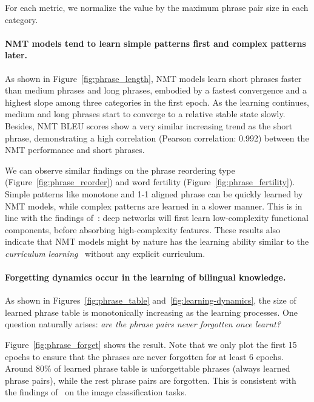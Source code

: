\documentclass[11pt,a4paper]{article}
\begin{document}
For each metric, we normalize the value by the maximum phrase pair size in each category.


\paragraph{NMT models tend to learn simple patterns first and complex patterns later.} As shown in Figure~\ref{fig:phrase_length}, NMT models learn short phrases faster than medium phrases and long phrases, embodied by a fastest convergence and a highest slope among three categories in the first epoch. As the learning continues, medium and long phrases start to converge to a relative stable state slowly. Besides, NMT BLEU scores show a very similar increasing trend as the short phrase, demonstrating a high correlation (Pearson correlation: 0.992) between the NMT performance and short phrases.

We can observe similar findings on the phrase reordering type (Figure~\ref{fig:phrase_reorder}) and word fertility (Figure~\ref{fig:phrase_fertility}). Simple patterns like monotone and 1-1 aligned phrase can be quickly learned by NMT models, while complex patterns are learned in a slower manner.
This is in line with the findings of~: deep networks will first learn low-complexity functional components, before absorbing high-complexity features.
These results also indicate that NMT models might by nature has the learning ability similar to the \textit{curriculum learning}~\cite{bengio2009curriculum,kocmi2017curriculum} without any explicit curriculum.



\paragraph{Forgetting dynamics occur in the learning of bilingual knowledge.}
As shown in Figures~\ref{fig:phrase_table} and~\ref{fig:learning-dynamics}, the size of learned phrase table is monotonically increasing as the learning processes. One question naturally arises: {\em are the phrase pairs never forgotten once learnt?}

Figure~\ref{fig:phrase_forget} shows the result. Note that we only plot the first 15 epochs to ensure that the phrases are never forgotten for at least 6 epochs. 
Around 80\% of learned phrase table is unforgettable phrases (always learned phrase pairs), while the rest phrase pairs are forgotten. This is consistent with the findings of~ on the image classification tasks.
\end{document}
